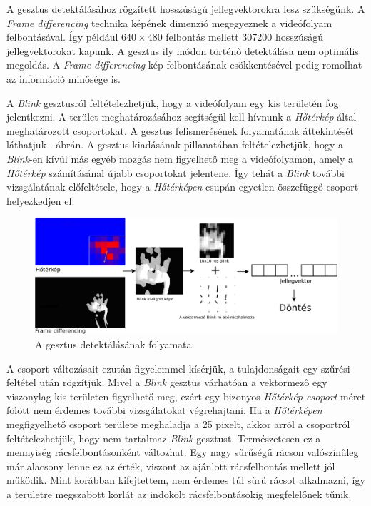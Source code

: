 A gesztus detektálásához rögzített hosszúságú jellegvektorokra lesz szükségünk. A \textit{Frame differencing} technika képének dimenzió megegyeznek a videófolyam felbontásával. Így például $640\times480$ felbontás mellett 307200 hosszúságú jellegvektorokat kapunk. A gesztus ily módon történő detektálása nem optimális megoldás. A \textit{Frame differencing} kép felbontásának csökkentésével pedig romolhat az információ minősége is.

A \textit{Blink} gesztusról feltételezhetjük, hogy a videófolyam egy kis területén fog jelentkezni. A terület meghatározásához segítségül kell hívnunk a \textit{Hőtérkép} által meghatározott csoportokat.
A gesztus felismerésének folyamatának áttekintését láthatjuk . ábrán.
A gesztus kiadásának pillanatában feltételezhetjük, hogy a \textit{Blink}-en kívül más egyéb mozgás nem figyelhető meg a videófolyamon, amely a \textit{Hőtérkép} számításánal újabb csoportokat jelentene. Így tehát a \textit{Blink} további vizsgálatának előfeltétele, hogy a \textit{Hőtérképen} csupán egyetlen összefüggő csoport helyezkedjen el.

\begin{figure}[h]
\centering
\includegraphics[width=\textwidth]{images/blink_flow.png}
\caption{A gesztus detektálásának folyamata}
\label{fig:blinkflow}
\end{figure}

A csoport változásait ezután figyelemmel kísérjük, a tulajdonságait egy szűrési feltétel után rögzítjük. Mivel a \textit{Blink} gesztus várhatóan a vektormező egy viszonylag kis területen figyelhető meg, ezért egy bizonyos \textit{Hőtérkép-csoport} méret fölött nem érdemes további vizsgálatokat végrehajtani. Ha a \textit{Hőtérképen} megfigyelhető csoport területe meghaladja a 25 pixelt, akkor arról a csoportról feltételezhetjük, hogy nem tartalmaz \textit{Blink} gesztust. Természetesen ez a mennyiség rácsfelbontásonként változhat. Egy nagy sűrűségű rácson valószínűleg már alacsony lenne ez az érték, viszont az ajánlott rácsfelbontás mellett jól működik. Mint korábban kifejtettem, nem érdemes túl sűrű rácsot alkalmazni, így a területre megszabott korlát az indokolt rácsfelbontásokig megfelelőnek tűnik.

